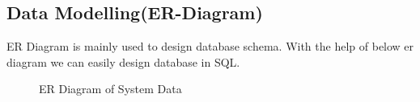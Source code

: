 \subsection{Data Modelling(ER-Diagram)}
ER Diagram is mainly used to design database schema. With the help of below er diagram we can easily design database in SQL.
\begin{figure}[H]
    \caption{ER Diagram of System Data}
\end{figure}
\newpage
